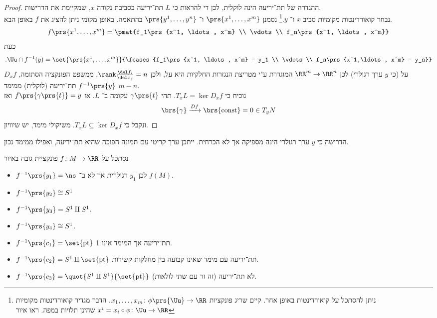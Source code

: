 \documentclass[a4paper,10pt,twoside,openany]{book}
\begin{document}
\begin{proof}
ההגדרה של תת־יריעה הינה לוקלית, לכן די להראות כי
$L$
תת־יריעה בסביבת נקודה
$x$,
שמקיימת את הדרישות.\\
נבחר קואורדינטות מקומיות סביב
$x$
ו־%
$y$.\footnote{ניתן להסתכל על קואורדינטות באופן אחר. קיים שריג פונקציות
$x_1, \ldots, x_m \colon \phi\prs{\Uu} \to \RR$. הדבר מגדיר קואורדינטות מקומיות
$x^i = x_i \circ \phi \colon \Uu \to \RR$
שהינן תלויות במפה. ראו איור
}
נסמנן
$\prs{x^1, \ldots, x^m}$
ו־%
$\prs{y^1, \ldots, y^n}$
בהתאמה.
באופן מקומי ניתן להציג את
$f$
באופן הבא.
\[f\prs{x^1, \ldots, x^m} = \pmat{f_1\prs{x^1, \ldots, x^m} \\ \vdots \\ f_n\prs{x^1, \ldots, x^m}}\]
כעת
\[\text{.} \Uu \cap f^{-1}(y) = \set{\prs{x^1, \ldots, x^m}}{\fcases{f_1\prs{x^1, \ldots, x^m} = y_1 \\ \vdots \\ f_n\prs{x^1,\ldots, x^m} = y_n}}\]
$D_x f$
על
(כי
$y$
ערך רגולרי) לכן
$\RR^m \to \RR^n$
המוגדרת ע"י מטריצת הנגזרות החלקיות היא על, ולכן
$\rank \frac{\del f_i}{\del x_j} = n$.
ממשפט הפונקציה הסתומה,
$f^{-1}\prs{y}$
תת־יריעה (לוקלית) ממימד
$m-n$.\\
נוכיח כי
$T_xL = \ker D_x f$.
תהי
$\gamma\prs{t}$
עקומה ב־%
$L$.
אז
$f\prs{\gamma\prs{t}} = y$
ואז
\[\brs{\gamma} \xrightarrow{Df} \brs{\text{const}} = 0 \in T_y N\]
ונקבל כי
$T_x L \subseteq \ker D_x f$.
משיקולי מימד, יש שיוויון.
\end{proof}
\begin{remark}
הדרישה כי
$y$
ערך רגולרי
הינה מספיקה אך לא הכרחית.
ייתכן ערך קריטי עם תמונה הפוכה שהיא תת־יריעה, ואפילו ממימד נכון.
\end{remark}
\begin{example}
נסתכל על
$f \colon M \to \RR$
פונקציית גובה באיור
\begin{itemize}
\item
$f^{-1}\prs{y_1} = \ns$
לכן
$y_1$
רגולרית אך לא ב־%
$f(M)$.
\item
$f^{-1}\prs{y_2} \cong S^1$
\item $f^{-1}\prs{y_3} = S^1 \amalg S^1$.
\item $f^{-1}\prs{y_4} \cong S^1$.
\item $f^{-1}\prs{c_1} = \set{\text{pt}}$
תת־יריעה אך המימד אינו 1.
\item $f^{-1}\prs{c_2} = S^1 \amalg \set{\text{pt}}$
תת־יריעה עם מימד שאינו קבועה בין מחלקות קשירות.
\item $f^{-1}\prs{c_3} = \quot{S^1 \amalg S^1}{\set{\text{pt}}}$
לא תת־יריעה (זה זר עם שתי לולאות).
\end{itemize}
\end{example}
\end{document}
